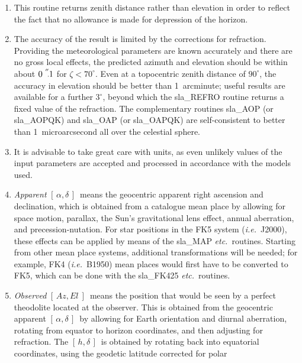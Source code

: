 \documentclass[11pt,twoside,nolof]{starlink}
\providecommand{\radec}     {$[\,\alpha,\delta\,]$}
\providecommand{\hadec}     {$[\,h,\delta\,]$}
\providecommand{\azel}      {$[\,Az,El~]$}
\providecommand{\arcsec}[2] {\arcseci{#1}$\hspace{-0.4em}.#2$}
\providecommand{\arcseci}[1] {$#1\hspace{-0.05em}$\raisebox{-0.5ex}
                         {$^{'\hspace{-0.1em}'}$}}
\begin{document}
{
 \begin{enumerate}
  \item This routine returns zenith distance rather than elevation
        in order to reflect the fact that no allowance is made for
        depression of the horizon.
  \item The accuracy of the result is limited by the corrections for
        refraction.  Providing the meteorological parameters are
        known accurately and there are no gross local effects, the
        predicted azimuth and elevation should be within about
        \arcsec{0}{1} for $\zeta<70^{\circ}$.  Even
        at a topocentric zenith distance of
        $90^{\circ}$, the accuracy in elevation should be better than
        1~arcminute;  useful results are available for a further
        $3^{\circ}$, beyond which the sla\_REFRO routine returns a
        fixed value of the refraction.  The complementary
        routines sla\_AOP (or sla\_AOPQK) and sla\_OAP (or sla\_OAPQK)
        are self-consistent to better than 1~microarcsecond all over
        the celestial sphere.
  \item It is advisable to take great care with units, as even
        unlikely values of the input parameters are accepted and
        processed in accordance with the models used.
  \item \textit{Apparent}\/ \radec\ means the geocentric apparent
        right ascension
        and declination, which is obtained from a catalogue mean place
        by allowing for space motion, parallax, the Sun's gravitational
        lens effect, annual aberration, and precession-nutation.  For
        star positions in the FK5 system (\textit{i.e.}\ J2000), these
        effects can
        be applied by means of the sla\_MAP \textit{etc.}\ routines.
        Starting from
        other mean place systems, additional transformations will be
        needed;  for example, FK4 (\textit{i.e.}\ B1950) mean places would
        first have to be converted to FK5, which can be done with the
        sla\_FK425 \textit{etc.}\ routines.
  \item \textit{Observed}\/ \azel\ means the position that would be seen by a
        perfect theodolite located at the observer.  This is obtained
        from the geocentric apparent \radec\ by allowing for Earth
        orientation and diurnal aberration, rotating from equator
        to horizon coordinates, and then adjusting for refraction.
        The \hadec\ is obtained by rotating back into equatorial
        coordinates, using the geodetic latitude corrected for polar

\end{enumerate}}
\end{document}
